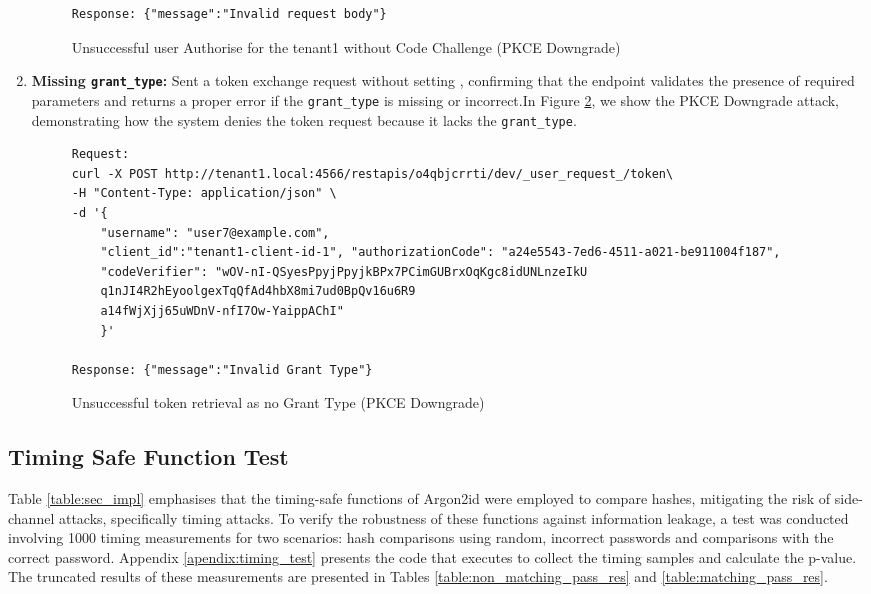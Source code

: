 \begin{enumerate}
\begin{figure}[!htbp]
\begin{lstlisting}[style=curlstyle]
Response: {"message":"Invalid request body"}
    \end{lstlisting}
    \caption{Unsuccessful user Authorise for the tenant1 without Code Challenge (PKCE Downgrade)}
    \label{fig:authorize_tenant_1_without_code_challenge}
\end{figure}

    \newpage
    \item \textbf{Missing \texttt{grant\_type}:} Sent a token exchange request without setting  \sloppy {}, confirming that the endpoint validates the presence of required parameters and returns a proper error if the \texttt{grant\_type} is missing or incorrect.In Figure \ref{fig:token_no_grant_type}, we show the PKCE Downgrade attack, demonstrating how the system denies the token request because it lacks the \texttt{grant\_type}.


                \begin{figure}[!htbp]
    \centering
    \begin{lstlisting}[style=curlstyle]
Request:
curl -X POST http://tenant1.local:4566/restapis/o4qbjcrrti/dev/_user_request_/token\                                      
-H "Content-Type: application/json" \
-d '{
    "username": "user7@example.com",
    "client_id":"tenant1-client-id-1", "authorizationCode": "a24e5543-7ed6-4511-a021-be911004f187",
    "codeVerifier": "wOV-nI-QSyesPpyjPpyjkBPx7PCimGUBrxOqKgc8idUNLnzeIkU
    q1nJI4R2hEyoolgexTqQfAd4hbX8mi7ud0BpQv16u6R9
    a14fWjXjj65uWDnV-nfI7Ow-YaippAChI"
    }'

Response: {"message":"Invalid Grant Type"}
    \end{lstlisting}
    \caption{Unsuccessful token retrieval as no Grant Type (PKCE Downgrade)}
    \label{fig:token_no_grant_type}
\end{figure}
\end{enumerate}
       


\subsection{Timing Safe Function Test}
\label{sec:timing_test}
Table \ref{table:sec_impl} emphasises that the timing-safe functions of Argon2id were employed to compare hashes, mitigating the risk of side-channel attacks, specifically timing attacks. To verify the robustness of these functions against information leakage, a test was conducted involving 1000 timing measurements for two scenarios: hash comparisons using random, incorrect passwords and comparisons with the correct password. Appendix \ref{apendix:timing_test} presents the code that executes to collect the timing samples and calculate the p-value. The truncated results of these measurements are presented in Tables \ref{table:non_matching_pass_res} and \ref{table:matching_pass_res}.

